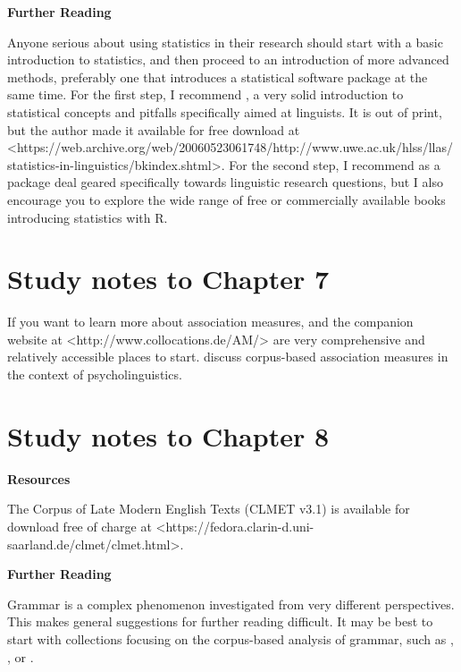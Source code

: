 \textbf{Further Reading}

Anyone serious about using statistics in their research should start with a basic introduction to statistics, and then proceed to an introduction of more advanced methods, preferably one that introduces a statistical software package at the same time. For the first step, I recommend \citet{butler_statistics_1985}, a very solid introduction to statistical concepts and pitfalls specifically aimed at linguists. It is out of print, but the author made it available for free download at <https://web.archive.org/web/20060523061748/http://www.uwe.ac.uk/hlss/llas/statistics-in-linguistics/bkindex.shtml>. For the second step, I recommend \citet{gries_statistics_2013} as a package deal geared specifically towards linguistic research questions, but I also encourage you to explore the wide range of free or commercially available books introducing statistics with R.


\section{Study notes to Chapter 7}
\label{sec:studynotes07}

If you want to learn more about association measures, \citet{evert_statistics_2005} and the companion website at <http://www.collocations.de/AM/> are very comprehensive and relatively accessible places to start. \citet{stefanowitsch_corpus-based_2016} discuss corpus-based association measures in the context of psycholinguistics.

\section{Study notes to Chapter 8}
\label{sec:studynotes08}

\textbf{Resources}

The Corpus of Late Modern English Texts (CLMET v3.1) is available for download free of charge at <https://fedora.clarin-d.uni-saarland.de/clmet/clmet.html>.

\textbf{Further Reading}

Grammar is a complex phenomenon investigated from very different perspectives. This makes general suggestions for further reading difficult. It may be best to start with collections focusing on the corpus-based analysis of grammar, such as \citet{rohdenburg_determinants_2003}, \citet{gries_corpora_2006}, \citet{rohdenburg_one_2009} or \citet{lindquist_corpus_2004}.

